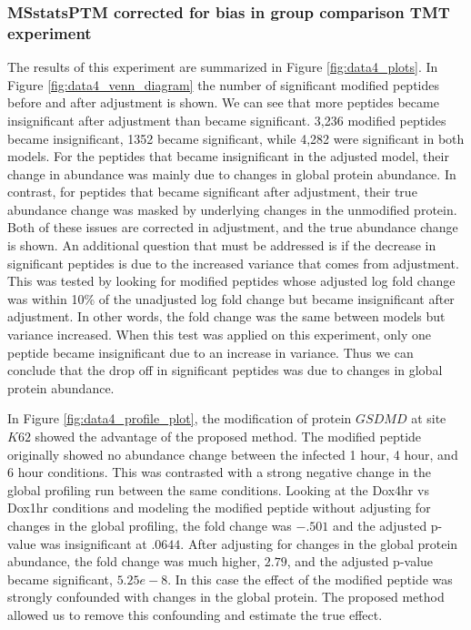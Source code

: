 \documentclass[mcp]{article}
\numberwithin{table}{section}
\begin{document}
\subsubsection*{MSstatsPTM corrected for bias in group comparison TMT experiment}

The results of this experiment are summarized in Figure \ref{fig:data4_plots}. In Figure \ref{fig:data4_venn_diagram} the number of significant modified peptides before and after adjustment is shown. We can see that more peptides became insignificant after adjustment than became significant. 3,236 modified peptides became insignificant, 1352 became significant, while 4,282 were significant in both models. For the peptides that became insignificant in the adjusted model, their change in abundance was mainly due to changes in global protein abundance. In contrast, for peptides that became significant after adjustment, their true abundance change was masked by underlying changes in the unmodified protein. Both of these issues are corrected in adjustment, and the true abundance change is shown. An additional question that must be addressed is if the decrease in significant peptides is due to the increased variance that comes from adjustment. This was tested by looking for modified peptides whose adjusted log fold change was within 10\% of the unadjusted log fold change but became insignificant after adjustment. In other words, the fold change was the same between models but variance increased. When this test was applied on this experiment, only one peptide became insignificant due to an increase in variance. Thus we can conclude that the drop off in significant peptides was due to changes in global protein abundance.

In Figure \ref{fig:data4_profile_plot}, the modification of protein $GSDMD$ at site $K62$ showed the advantage of the proposed method. The modified peptide originally showed no abundance change between the infected 1 hour, 4 hour, and 6 hour conditions. This was contrasted with a strong negative change in the global profiling run between the same conditions. Looking at the Dox4hr vs Dox1hr conditions and modeling the modified peptide without adjusting for changes in the global profiling, the fold change was $-.501$ and the adjusted p-value was insignificant at $.0644$. After adjusting for changes in the global protein abundance, the fold change was much higher, $2.79$, and the adjusted p-value became significant, $5.25e-8$. In this case the effect of the modified peptide was strongly confounded with changes in the global protein. The proposed method allowed us to remove this confounding and estimate the true effect.
\end{document}
